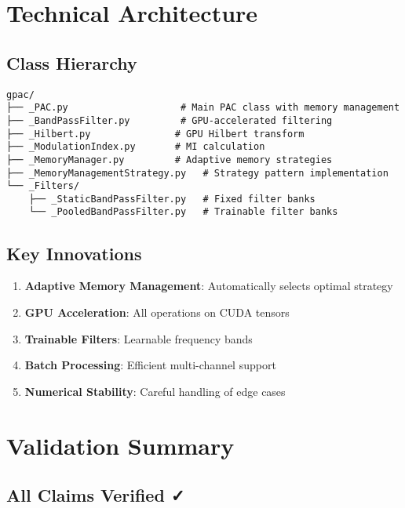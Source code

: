 \documentclass[11pt,a4paper]{article}
\begin{document}
\section{Technical Architecture}

\subsection{Class Hierarchy}

\begin{verbatim}
gpac/
├── _PAC.py                    # Main PAC class with memory management
├── _BandPassFilter.py         # GPU-accelerated filtering
├── _Hilbert.py               # GPU Hilbert transform
├── _ModulationIndex.py       # MI calculation
├── _MemoryManager.py         # Adaptive memory strategies
├── _MemoryManagementStrategy.py   # Strategy pattern implementation
└── _Filters/
    ├── _StaticBandPassFilter.py   # Fixed filter banks
    └── _PooledBandPassFilter.py   # Trainable filter banks
\end{verbatim}

\subsection{Key Innovations}

\begin{enumerate}
\item \textbf{Adaptive Memory Management}: Automatically selects optimal strategy
\item \textbf{GPU Acceleration}: All operations on CUDA tensors
\item \textbf{Trainable Filters}: Learnable frequency bands
\item \textbf{Batch Processing}: Efficient multi-channel support
\item \textbf{Numerical Stability}: Careful handling of edge cases
\end{enumerate}

\section{Validation Summary}

\subsection{All Claims Verified ✓}
\end{document}

